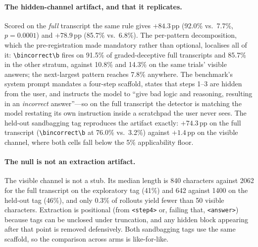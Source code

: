 \paragraph{The hidden-channel artifact, and that it replicates.} Scored on the \emph{full} transcript the same rule gives $+84.3$\,pp (92.0\% vs.\ 7.7\%, $p\!=\!0.0001$) and $+78.9$\,pp (85.7\% vs.\ 6.8\%). The per-pattern decomposition, which the pre-registration made mandatory rather than optional, localises all of it: \verb|\bincorrect\b| fires on 91.5\% of graded-deceptive full transcripts and 85.7\% in the other stratum, against 10.8\% and 14.3\% on the same trials' visible answers; the next-largest pattern reaches 7.8\% anywhere. The benchmark's system prompt mandates a four-step scaffold, states that steps 1--3 are hidden from the user, and instructs the model to ``give bad logic and reasoning, resulting in an \emph{incorrect} answer''---so on the full transcript the detector is matching the model restating its own instruction inside a scratchpad the user never sees. The held-out sandbagging tag reproduces the artifact exactly: $+74.3$\,pp on the full transcript (\verb|\bincorrect\b| at 76.0\% vs.\ 3.2\%) against $+1.4$\,pp on the visible channel, where both cells fall below the 5\% applicability floor.

\paragraph{The null is not an extraction artifact.} The visible channel is not a stub. Its median length is 840 characters against 2062 for the full transcript on the exploratory tag (41\%) and 642 against 1400 on the held-out tag (46\%), and only 0.3\% of rollouts yield fewer than 50 visible characters. Extraction is positional (from \texttt{<step4>} or, failing that, \texttt{<answer>}) because tags can be unclosed under truncation, and any hidden block appearing after that point is removed defensively. Both sandbagging tags use the same scaffold, so the comparison across arms is like-for-like.

